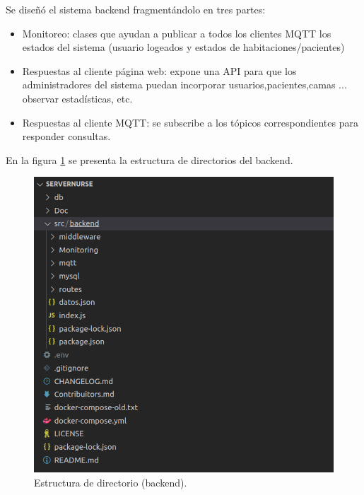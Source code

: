 Se diseñó el sistema backend fragmentándolo en tres partes:

\begin{itemize}
\item Monitoreo: clases que ayudan a publicar a todos los clientes MQTT los estados del sistema (usuario logeados y estados de habitaciones/pacientes) 
\item Respuestas al cliente página web: expone una API para que los administradores del sistema puedan incorporar usuarios,pacientes,camas ... observar estadísticas, etc.
\item Respuestas al cliente MQTT: se subscribe a los tópicos correspondientes para responder consultas.
\end{itemize}

En la figura \ref{fig:Estructura de directorio(backend)} se presenta la estructura de directorios del backend.

\begin{figure}[ht]
	\centering
	\includegraphics[scale=.45]{./Figures/projectStructure.png}
	\caption{Estructura de directorio (backend).}
	\label{fig:Estructura de directorio(backend)}
\end{figure}

